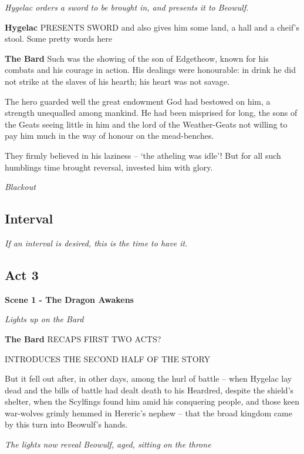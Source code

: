 \documentclass[a4paper]{article}
\begin{document}
{\centerline{\textit{Hygelac orders a sword to be brought in, and presents it to Beowulf.}}

\textbf{Hygelac} PRESENTS SWORD and also gives him some land, a hall and a cheif's stool. Some pretty words here

\textbf{The Bard} Such was the showing of the son of Edgetheow,
known for his combats and his courage in action.
His dealings were honourable: in drink he did not strike
at the slaves of his hearth; his heart was not savage.

The hero guarded well the great endowment
God had bestowed on him, a strength unequalled
among mankind. He had been misprised for long,
the sons of the Geats seeing little in him
and the lord of the Weather-Geats not willing to pay him
much in the way of honour on the mead-benches.

They firmly believed in his laziness
– ‘the atheling was idle’! But for all such humblings
time brought reversal, invested him with glory.

\centerline{\textit{Blackout}}

\subsection{Interval}%

\centerline{\textit{If an interval is desired, this is the time to have it.}}

\subsection{Act 3}%

\centerline{\textbf{Scene 1 - The Dragon Awakens}}
\centerline{\textit{Lights up on the Bard}}

\textbf{The Bard} RECAPS FIRST TWO ACTS? 

INTRODUCES THE SECOND HALF OF THE STORY

But it fell out after, in other days,
among the hurl of battle – when Hygelac lay dead
and the bills of battle had dealt death to his Heardred,
despite the shield’s shelter, when the Scylfings found him
amid his conquering people, and those keen war-wolves
grimly hemmed in Hereric’s nephew –
that the broad kingdom came by this turn
into Beowulf’s hands.

\centerline{\textit{The lights now reveal Beowulf, aged, sitting on the throne}}

}
\end{document}
